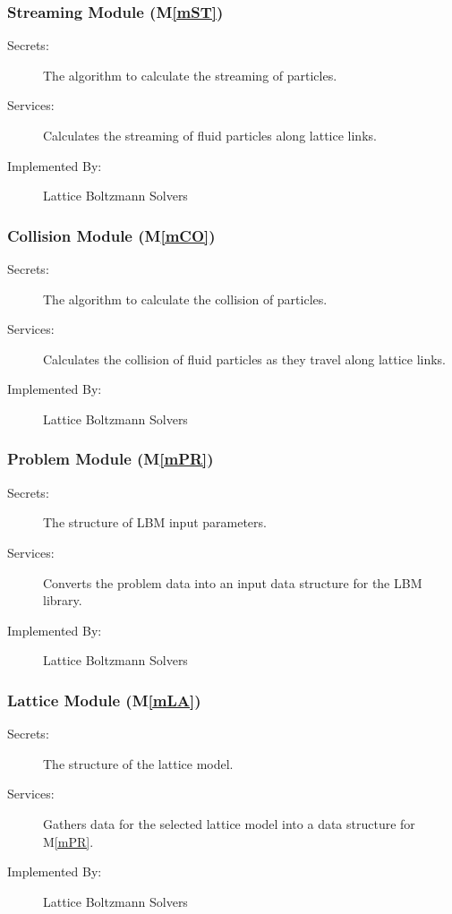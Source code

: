 \documentclass[12pt, titlepage]{article}
\newcommand{\mref}[1]{M\ref{#1}}
\newcommand{\famname}{Lattice Boltzmann Solvers} %
\begin{document}
\subsubsection{Streaming Module (\mref{mST})}

\begin{description}
	\item[Secrets:]The algorithm to calculate the streaming of particles.
	\item[Services:]Calculates the streaming of fluid particles along lattice links.
	\item[Implemented By:] \famname
\end{description}

\subsubsection{Collision Module (\mref{mCO})}

\begin{description}
	\item[Secrets:]The algorithm to calculate the collision of particles.
	\item[Services:]Calculates the collision of fluid particles as they travel along lattice links.
	\item[Implemented By:] \famname
\end{description}

\subsubsection{Problem Module (\mref{mPR})}

\begin{description}
	\item[Secrets:]The structure of LBM input parameters.
	\item[Services:]Converts the problem data into an input data structure for the LBM library.
	\item[Implemented By:] \famname
\end{description}

\subsubsection{Lattice Module (\mref{mLA})}

\begin{description}
	\item[Secrets:]The structure of the lattice model.
	\item[Services:]Gathers data for the selected lattice model into a data structure for \mref{mPR}.
	\item[Implemented By:] \famname
\end{description}
\end{document}
